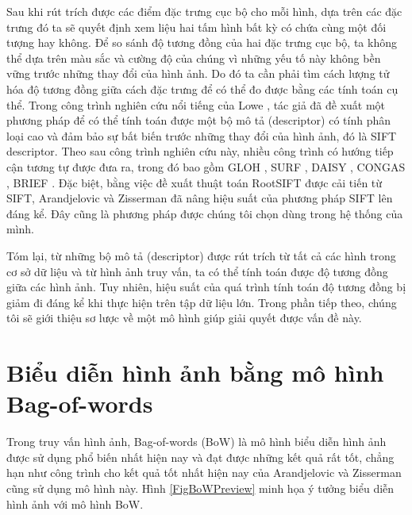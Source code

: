 Sau khi rút trích được các điểm đặc trưng cục bộ cho mỗi hình, dựa trên các đặc trưng đó ta sẽ quyết định xem liệu hai tấm hình bất kỳ có chứa cùng một đối tượng hay không. Để so sánh độ tương đồng của hai đặc trưng cục bộ, ta không thể dựa trên màu sắc và cường độ của chúng vì những yếu tố này không bền vững trước những thay đổi của hình ảnh. Do đó ta cần phải tìm cách lượng tử hóa độ tương đồng giữa cách đặc trưng để có thể đo được bằng các tính toán cụ thể. Trong công trình nghiên cứu nổi tiếng của Lowe \cite{lowe2004distinctive}, tác giả đã đề xuất một phương pháp để có thể tính toán được một bộ mô tả (descriptor) có tính phân loại cao và đảm bảo sự bất biến trước những thay đổi của hình ảnh, đó là SIFT descriptor. Theo sau công trình nghiên cứu này, nhiều công trình có hướng tiếp cận tương tự được đưa ra, trong đó bao gồm GLOH \cite{mikolajczyk2005performance}, SURF \cite{bay2006surf}, DAISY \cite{tola2008fast}, CONGAS \cite{zheng2009tour}, BRIEF \cite{calonder2010brief}. Đặc biệt, bằng việc đề xuất thuật toán RootSIFT được cải tiến từ SIFT, Arandjelovic và Zisserman \cite{arandjelovic2012three} đã nâng hiệu suất của phương pháp SIFT lên đáng kể. Đây cũng là phương pháp được chúng tôi chọn dùng trong hệ thống của mình.

Tóm lại, từ những bộ mô tả (descriptor) được rút trích từ tất cả các hình trong cơ sở dữ liệu và từ hình ảnh truy vấn, ta có thể tính toán được độ tương đồng giữa các hình ảnh. Tuy nhiên, hiệu suất của quá trình tính toán độ tương đồng bị giảm đi đáng kể khi thực hiện trên tập dữ liệu lớn. Trong phần tiếp theo, chúng tôi sẽ giới thiệu sơ lược về một mô hình giúp giải quyết được vấn đề này.

\section{Biểu diễn hình ảnh bằng mô hình Bag-of-words}
\label{bag-of-words}
Trong truy vấn hình ảnh, Bag-of-words (BoW) là mô hình biểu diễn hình ảnh được sử dụng phổ biến nhất hiện nay và đạt được những kết quả rất tốt, chẳng hạn như công trình cho kết quả tốt nhất hiện nay của Arandjelovic và Zisserman\cite{arandjelovic2012three} cũng sử dụng mô hình này. Hình \ref{FigBoWPreview} minh họa ý tưởng biểu diễn hình ảnh với mô hình BoW.

